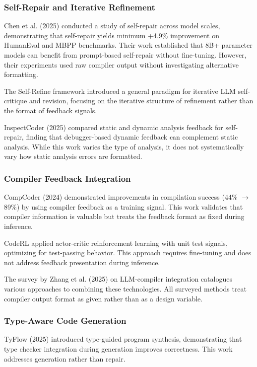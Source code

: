 
\subsubsection{Self-Repair and Iterative Refinement}

Chen et al. (2025) conducted a study of self-repair across model scales, demonstrating that self-repair yields minimum +4.9\% improvement on HumanEval and MBPP benchmarks. Their work established that 8B+ parameter models can benefit from prompt-based self-repair without fine-tuning. However, their experiments used raw compiler output without investigating alternative formatting.

The Self-Refine framework \citep{madaan2023selfrefine} introduced a general paradigm for iterative LLM self-critique and revision, focusing on the iterative structure of refinement rather than the format of feedback signals.

InspectCoder (2025) compared static and dynamic analysis feedback for self-repair, finding that debugger-based dynamic feedback can complement static analysis. While this work varies the type of analysis, it does not systematically vary how static analysis errors are formatted.

\subsubsection{Compiler Feedback Integration}

CompCoder (2024) demonstrated improvements in compilation success (44\% $\rightarrow$ 89\%) by using compiler feedback as a training signal. This work validates that compiler information is valuable but treats the feedback format as fixed during inference.

CodeRL \citep{shojaee2023coderl} applied actor-critic reinforcement learning with unit test signals, optimizing for test-passing behavior. This approach requires fine-tuning and does not address feedback presentation during inference.

The survey by Zhang et al. (2025) on LLM-compiler integration catalogues various approaches to combining these technologies. All surveyed methods treat compiler output format as given rather than as a design variable.

\subsubsection{Type-Aware Code Generation}

TyFlow (2025) introduced type-guided program synthesis, demonstrating that type checker integration during generation improves correctness. This work addresses generation rather than repair.

